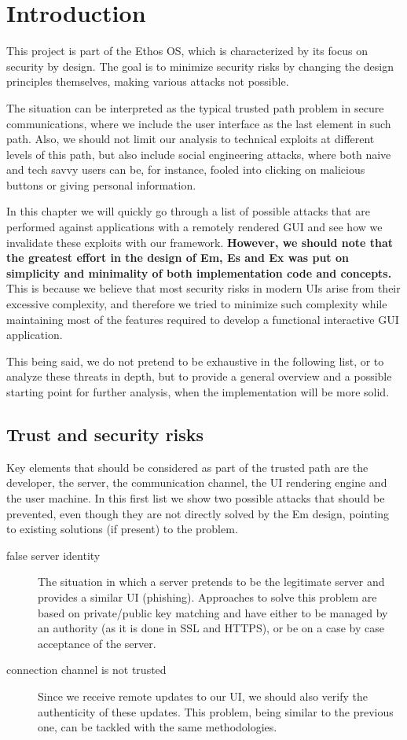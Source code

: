 
\section{Introduction} \label{sec:secur1}
This project is part of the Ethos OS, which is characterized by its focus on security by design. The goal is to minimize security risks by changing the design principles themselves, making various attacks not possible.

The situation can be interpreted as the typical trusted path problem in secure communications, where we include the user interface as the last element in such path. Also, we should not limit our analysis to technical exploits at different levels of this path, but also include social engineering attacks, where both naive and tech savvy users can be, for instance, fooled into clicking on malicious buttons or giving personal information.

In this chapter we will quickly go through a list of possible attacks that are performed against applications with a remotely rendered GUI and see how we invalidate these exploits with our framework. \textbf{However, we should note that the greatest effort in the design of Em, Es and Ex was put on simplicity and minimality of both implementation code and concepts.} This is because we believe that most security risks in modern UIs arise from their excessive complexity, and therefore we tried to minimize such complexity while maintaining most of the features required to develop a functional interactive GUI application.

 This being said, we do not pretend to be exhaustive in the following list, or to analyze these threats in depth, but to provide a general overview and a possible starting point for further analysis, when the implementation will be more solid.

\subsection{Trust and security risks}

Key elements that should be considered as part of the trusted path are the developer, the server, the communication channel, the UI rendering engine and the user machine. In this first list we show two possible attacks that should be prevented, even though they are not directly solved by the Em design, pointing to existing solutions (if present) to the problem.
\begin{description}
	\item[false server identity] The situation in which a server pretends to be the legitimate server and provides a similar UI (phishing). Approaches to solve this problem are based on private/public key matching and have either to be managed by an authority (as it is done in  SSL and HTTPS), or be on a case by case acceptance of the server.
	\item[connection channel is not trusted] Since we receive remote updates to our UI, we should also verify the authenticity of these updates. This problem, being similar to the previous one, can be tackled with the same methodologies.
\end{description}

